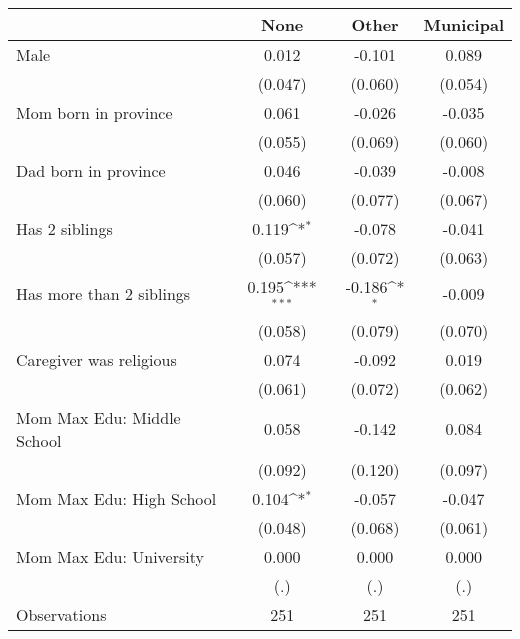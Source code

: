{
\def\sym#1{\ifmmode^{#1}\else\(^{#1}\)\fi}
\begin{tabular}{l*{3}{c}}
\toprule
                    &\multicolumn{1}{c}{None}&\multicolumn{1}{c}{Other}&\multicolumn{1}{c}{Municipal}\\
\midrule
Male                &       0.012         &      -0.101         &       0.089         \\
                    &     (0.047)         &     (0.060)         &     (0.054)         \\
\addlinespace
Mom born in province&       0.061         &      -0.026         &      -0.035         \\
                    &     (0.055)         &     (0.069)         &     (0.060)         \\
\addlinespace
Dad born in province&       0.046         &      -0.039         &      -0.008         \\
                    &     (0.060)         &     (0.077)         &     (0.067)         \\
\addlinespace
Has 2 siblings      &       0.119\sym{*}  &      -0.078         &      -0.041         \\
                    &     (0.057)         &     (0.072)         &     (0.063)         \\
\addlinespace
Has more than 2 siblings&       0.195\sym{***}&      -0.186\sym{*}  &      -0.009         \\
                    &     (0.058)         &     (0.079)         &     (0.070)         \\
\addlinespace
Caregiver was religious&       0.074         &      -0.092         &       0.019         \\
                    &     (0.061)         &     (0.072)         &     (0.062)         \\
\addlinespace
Mom Max Edu: Middle School&       0.058         &      -0.142         &       0.084         \\
                    &     (0.092)         &     (0.120)         &     (0.097)         \\
\addlinespace
Mom Max Edu: High School&       0.104\sym{*}  &      -0.057         &      -0.047         \\
                    &     (0.048)         &     (0.068)         &     (0.061)         \\
\addlinespace
Mom Max Edu: University&       0.000         &       0.000         &       0.000         \\
                    &         (.)         &         (.)         &         (.)         \\
\midrule
Observations        &         251         &         251         &         251         \\
\bottomrule
\end{tabular}
}
